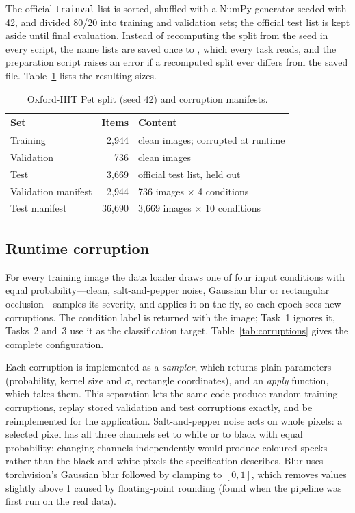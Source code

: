 \documentclass[conference]{IEEEtran}
\DeclareRobustCommand{\file}[1]{\expandafter\filepath\expandafter{\detokenize{#1}}}
\begin{document}
The official \texttt{trainval} list is sorted, shuffled with a NumPy
generator seeded with 42, and divided 80/20 into training and validation
sets; the official test list is kept aside until final evaluation. Instead
of recomputing the split from the seed in every script, the name lists are
saved once to \file{manifests/pet_split.json}, which every task reads, and
the preparation script raises an error if a recomputed split ever differs
from the saved file. Table~\ref{tab:pet_split} lists the resulting sizes.

\begin{table}[t]
\centering
\caption{Oxford-IIIT Pet split (seed 42) and corruption manifests.}
\label{tab:pet_split}
\footnotesize
\begin{tabular}{lrl}
\toprule
Set & Items & Content \\
\midrule
Training   & 2,944  & clean images; corrupted at runtime \\
Validation & 736    & clean images \\
Test       & 3,669  & official test list, held out \\
\midrule
Validation manifest & 2,944  & 736 images $\times$ 4 conditions \\
Test manifest       & 36,690 & 3,669 images $\times$ 10 conditions \\
\bottomrule
\end{tabular}
\end{table}

\subsection{Runtime corruption}
For every training image the data loader draws one of four input
conditions with equal probability---clean, salt-and-pepper noise, Gaussian
blur or rectangular occlusion---samples its severity, and applies it on the
fly, so each epoch sees new corruptions. The condition label is returned
with the image; Task~1 ignores it, Tasks~2 and~3 use it as the classification
target. Table~\ref{tab:corruptions} gives the complete configuration.

Each corruption is implemented as a \emph{sampler}, which returns plain
parameters (probability, kernel size and $\sigma$, rectangle coordinates),
and an \emph{apply} function, which takes them. This separation lets the
same code produce random training corruptions, replay stored validation and
test corruptions exactly, and be reimplemented for the application.
Salt-and-pepper noise acts on whole pixels: a selected pixel has all three
channels set to white or to black with equal probability; changing channels
independently would produce coloured specks rather than the black and white
pixels the specification describes. Blur uses torchvision's Gaussian blur
followed by clamping to $[0,1]$, which removes values slightly above 1
caused by floating-point rounding (found when the pipeline was first run on
the real data).
\end{document}
